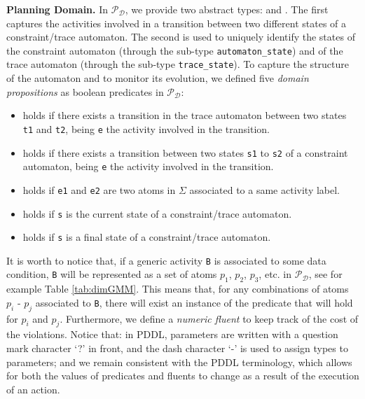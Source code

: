 \medskip
\noindent
\textbf{Planning Domain.}
%
In $\mathcal{P_D}$, we provide two abstract types:  and .
%
The first captures the activities involved in a transition between two different states of a constraint/trace automaton.
%
The second is used to uniquely identify the states of the constraint automaton (through the sub-type \texttt{automaton\_state}) and of the trace automaton (through the sub-type \texttt{trace\_state}).
%
To capture the structure of the automaton and to monitor its evolution, we defined five \emph{domain propositions} as boolean predicates in $\mathcal{P_D}$:
%
\begin{itemize}
	\item {} holds if there exists a transition in the trace automaton between two states \texttt{t1} and \texttt{t2}, being \texttt{e} the activity involved in the transition.
	\item {} holds if there exists a transition between two states \texttt{s1} to \texttt{s2} of a constraint automaton, being \texttt{e} the activity involved in the transition.
    \item {} holds if \texttt{e1} and \texttt{e2} are two atoms in $\Sigma$ associated to a same activity label.
	\item {} holds if \texttt{s} is the current state of a constraint/trace automaton.
	\item {} holds if \texttt{s} is a final state of a constraint/trace automaton.
\end{itemize}
It is worth to notice that, if a generic activity \texttt{B} is associated to some data condition, \texttt{B} will be represented as a set of atoms $p_1$, $p_2$, $p_3$, etc. in $\mathcal{P_D}$, see for example Table \ref{tab:dimGMM}. This means that, for any combinations of atoms $p_i$ - $p_j$ associated to \texttt{B}, there will exist an instance of the predicate  that will hold for $p_i$ and $p_j$.
%
%
Furthermore, we define a \emph{numeric fluent}  to keep track of the cost of the violations. Notice that: \myi in PDDL, parameters are written with a question mark character `?' in front, and the dash character `-' is used to assign types to parameters; and \myii we remain consistent with the PDDL terminology, which allows for both the values of predicates and fluents to change as a result of the execution of an action.
%

